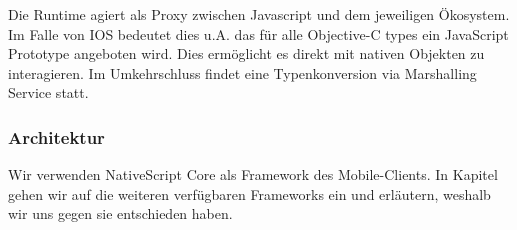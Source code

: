 Die Runtime agiert als Proxy zwischen Javascript und dem jeweiligen Ökosystem.
Im Falle von IOS bedeutet dies u.A. das für alle Objective-C types ein JavaScript Prototype angeboten wird.
Dies ermöglicht es direkt mit nativen Objekten zu interagieren.
Im Umkehrschluss findet eine Typenkonversion via Marshalling Service statt\cite{ns-ios-runtime}.

\subsubsection{Architektur}
Wir verwenden NativeScript Core als Framework des Mobile-Clients.
In Kapitel \emph{} gehen wir auf die weiteren verfügbaren Frameworks ein und erläutern, weshalb wir uns gegen sie entschieden haben.

\clearpage

